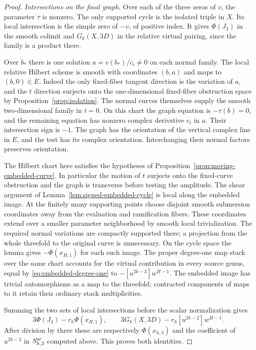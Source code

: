 \begin{proof}
\emph{Intersections on the final graph.}
Over each of the three zeros of $v$, the parameter $\tau$ is nonzero.
The only supported cycle is the isolated triple in $X$. Its local
intersection is the simple zero of $-v$, of positive index. It gives
$\Phi(J_3)$ in the smooth colimit and $G_k(X,3D)$ in the relative
virtual pairing, since the family is a product there.

Over $b_*$ there is one solution $a=v(b_*)/c_i\ne0$ on each
normal family. The local relative Hilbert scheme is smooth with
coordinates $(b,a)$ and maps to $(b,0)\in E$. Indeed the only
fixed-fiber tangent direction is the variation of $a$, and the
$t$ direction surjects onto the one-dimensional fixed-fiber
obstruction space by Proposition~\ref{prop:isolation}. The
normal curves themselves supply the smooth two-dimensional family
in $t=0$. On this chart the graph equation is $-\tau(b)=0$,
and the remaining equation has nonzero complex derivative $c_i$
in $a$. Their intersection sign is $-1$. The graph has the
orientation of the vertical complex line in $E$, and the test
has its complex orientation. Interchanging their normal factors
preserves orientation.

The Hilbert chart here satisfies the hypotheses of
Proposition~\ref{prop:moving-embedded-curve}. In particular the
motion of $t$ surjects onto the fixed-curve obstruction and the
graph is transverse before testing the amplitude. The shear argument
of Lemma~\ref{lem:signed-embedded-cycle} is local along the embedded
image. At the finitely many supporting points choose disjoint smooth
submersion coordinates away from the evaluation and ramification
fibers. These coordinates extend over a smaller parameter neighborhood
by smooth local trivialization. The required normal variations are
compactly supported there; a projection from the whole threefold to
the original curve is unnecessary. On the cycle space the lemma gives
$-\Phi(x_{H,1})$ for each such image. The proper degree-one map stack
over the same chart accounts for the virtual contribution in every
source genus, equal by \eqref{eq:embedded-degree-one} to
$-[u^{2k-2}]w^{H-1}$. The embedded image has trivial automorphisms
as a map to the threefold; contracted components of maps to it retain
their ordinary stack multiplicities.

Summing the two sets of local intersections before the scalar
normalization gives
\[
        3\Phi(J_3)-r_h\Phi(x_{H,1}),\qquad
        3G_k(X,3D)-r_h[u^{2k-2}]w^{H-1}.
\]
After division by three these are respectively $\Phi(x_{h,3})$
and the coefficient of $u^{2k-2}$ in $S^{\rm sc}_{h,3}$ computed
above. This proves both identities.
\end{proof}
